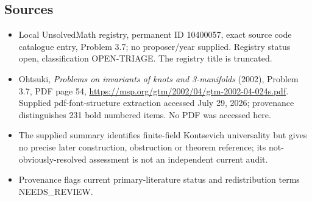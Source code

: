 \documentclass[11pt]{article}
\begin{document}
\subsection{Sources}
\begin{itemize}
\item Local UnsolvedMath registry, permanent ID 10400057, exact source code catalogue entry, Problem 3.7; no proposer/year supplied. Registry status open, classification OPEN-TRIAGE. The registry title is truncated.
\item Ohtsuki, \emph{Problems on invariants of knots and 3-manifolds} (2002), Problem 3.7, PDF page 54, \url{https://msp.org/gtm/2002/04/gtm-2002-04-024s.pdf}. Supplied pdf-font-structure extraction accessed July 29, 2026; provenance distinguishes 231 bold numbered items. No PDF was accessed here.
\item The supplied summary identifies finite-field Kontsevich universality but gives no precise later construction, obstruction or theorem reference; its not-obviously-resolved assessment is not an independent current audit.
\item Provenance flags current primary-literature status and redistribution terms NEEDS\_REVIEW.
\end{itemize}
\end{document}
